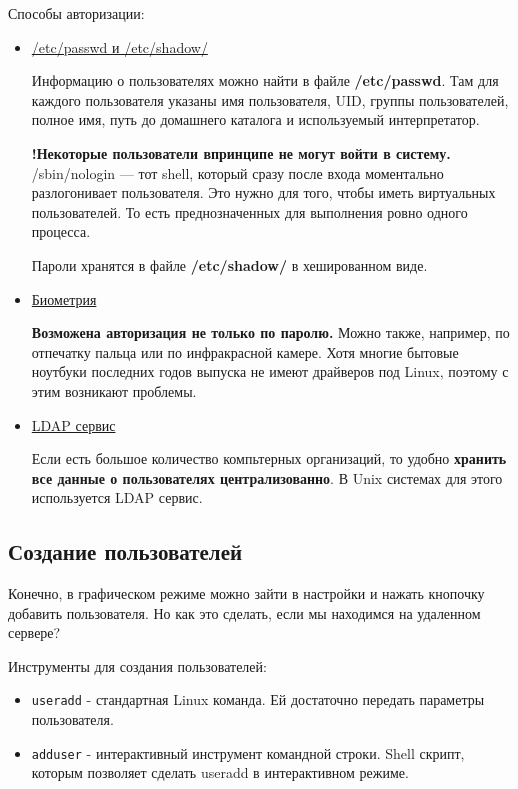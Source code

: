Способы авторизации:
\begin{itemize}
	\item \underline{/etc/passwd и /etc/shadow/}
	
	Информацию о пользователях можно найти в файле \textbf{/etc/passwd}. Там для каждого пользователя
	указаны имя пользователя, UID, группы пользователей, полное имя, путь до домашнего каталога и используемый интерпретатор.
	
	\textbf{!Некоторые пользователи впринципе не могут войти в систему.} /sbin/nologin --- тот shell, который сразу после входа моментально разлогонивает пользователя. Это нужно для того, чтобы иметь виртуальных пользователей. То есть преднозначенных для выполнения ровно одного процесса.
	
	Пароли хранятся в файле \textbf{/etc/shadow/} в хешированном виде.
	
	\item \underline{Биометрия} 
	
	\textbf{Возможена авторизация не только по паролю.} Можно также, например, по отпечатку пальца 
	или по инфракрасной камере. Хотя многие бытовые ноутбуки последних годов выпуска не
	имеют драйверов под Linux, поэтому с этим возникают проблемы.
	
	\item \underline{LDAP сервис}

	Если есть большое количество компьтерных организаций, то удобно \textbf{хранить все данные о пользователях централизованно}. В Unix системах для этого используется LDAP сервис.
\end{itemize}


\subsection{Создание пользователей}

Конечно, в графическом режиме можно зайти в настройки и нажать кнопочку добавить пользователя. Но как это сделать, если мы находимся на удаленном сервере?

Инструменты для создания пользователей:
\begin{itemize}
	\item \texttt{useradd} - стандартная Linux команда. Ей достаточно передать параметры пользователя.
	\item \texttt{adduser} - интерактивный инструмент командной строки. Shell скрипт, которым позволяет сделать useradd в интерактивном режиме.
\end{itemize}

